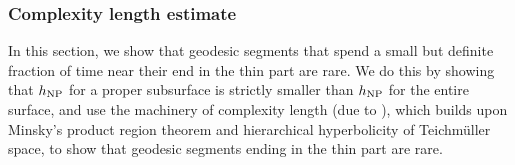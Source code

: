 \subsubsection*{Complexity length estimate}

In this section, we
show that geodesic segments that spend a small but definite fraction of time near their end in the thin part are rare.
We do this by showing that $h_{\mathrm{NP}}$ for a proper subsurface is strictly smaller than $h_{\mathrm{NP}}$ for the entire surface, and use the machinery of complexity length (due to \textcite{dowdall2023lattice}), which builds upon Minsky's product region theorem and hierarchical hyperbolicity of Teichmüller space, to show that geodesic segments ending in the thin part are rare.

